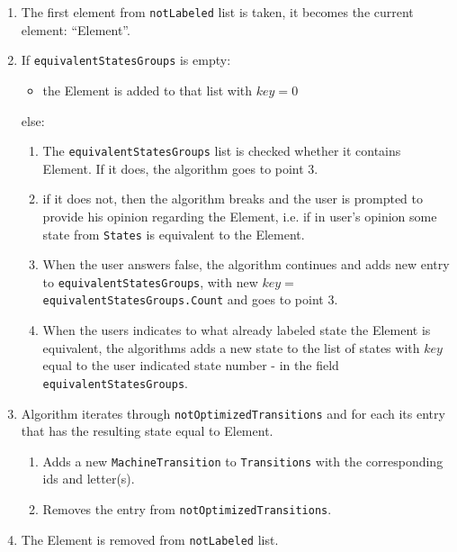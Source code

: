 \documentclass{article}
\begin{document}
\begin{enumerate}

  \item The first element from \verb|notLabeled| list is taken, it becomes the current element:
  ``Element''.

  \item If \verb|equivalentStatesGroups| is empty:

  \begin{itemize}
    \item the Element is added to that list with $key = 0$
  \end{itemize}

  else:

  \begin{enumerate}

    \item The \verb|equivalentStatesGroups| list is checked whether it contains Element. If it does,
    the algorithm goes to point 3.

    \item if it does not, then the algorithm breaks and the user is prompted to provide his opinion
    regarding the Element, i.e. if in user's opinion some state from \verb|States| is equivalent to
    the Element.

    \item When the user answers false, the algorithm continues and adds new entry to
    \verb|equivalentStatesGroups|, with new $key = $\verb|equivalentStatesGroups.Count| and goes to point 3.

    \item When the users indicates to what already labeled state the Element is equivalent, the
    algorithms adds a new state to the list of states with $key$ equal to the user indicated state
    number - in the field \verb|equivalentStatesGroups|.

  \end{enumerate}

  \item Algorithm iterates through \verb|notOptimizedTransitions| and for each its entry that has
  the resulting state equal to Element.

  \begin{enumerate}

    \item Adds a new \verb|MachineTransition| to \verb|Transitions| with the corresponding ids and
    letter(s).

    \item Removes the entry from \verb|notOptimizedTransitions|.

  \end{enumerate}

  \item The Element is removed from \verb|notLabeled| list.

\end{enumerate}
\end{document}
